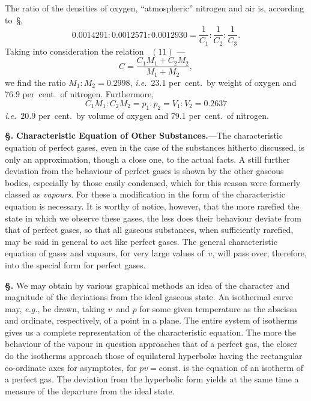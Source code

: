 \documentclass[12pt]{book}[2005/09/16]
\newcommand{\Chg}[2]{#2}
\newcommand{\Add}[1]{\Chg{}{#1}}
\newcommand{\Section}[1]{
  \medskip\par\textbf{§\;#1}
  \label{section:#1}
}
\newcommand{\SecRef}[2][§\;]{\hyperref[section:#2.]{{\upshape #1#2}}}
\newcommand{\Eq}[1]{%
  \hyperref[eqn:#1]{\ensuremath{#1}}%
}
\newcommand{\PageSep}[1]{\ignorespaces}
\newcommand{\Topic}[1]{\textbf{#1}}
\newcommand{\const}{\text{const.}}
\newcommand{\eg}{\emph{e.g.}}
\newcommand{\ie}{\emph{i.e.}}
\begin{document}
The ratio of the densities of oxygen, ``atmospheric''
nitrogen and air is, according to~\SecRef{11},
\[
0.0014291 : 0.0012571 : 0.0012930 = \frac{1}{C_{1}} : \frac{1}{C_{2}} : \frac{1}{C_{3}}\Add{.}
\]
\PageSep{12}
Taking into consideration the relation~\Eq{(11)}---
\[
C = \frac{C_{1}M_{1} + C_{2}M_{2}}{M_{1} + M_{2}},
\]
we find the ratio $M_{1} : M_{2} = 0.2998$, \ie\ $23.1$ per~cent.\
by weight of oxygen and $76.9$ per~cent.\ of nitrogen.
Furthermore,
\[
C_{1}M_{1} : C_{2}M_{2} = p_{1} : p_{2} = V_{1} : V_{2} = 0.2637
\]
\ie\ $20.9$ per~cent.\ by volume of oxygen and $79.1$ per~cent.\ of
nitrogen.

\Section{21.} \Topic{Characteristic Equation of Other Substances.}---The
characteristic equation of perfect gases, even in the
case of the substances hitherto discussed, is only an approximation,
though a close one, to the actual facts. A still
further deviation from the behaviour of perfect gases is
shown by the other gaseous bodies, especially by those easily
condensed, which for this reason were formerly classed as
\emph{vapours}. For these a modification in the form of the
characteristic equation is necessary. It is worthy of notice,
however, that the more rarefied the state in which we observe
these gases, the less does their behaviour deviate from that
of perfect gases, so that all gaseous substances, when sufficiently
rarefied, may be said in general to act like perfect
gases. The general characteristic equation of gases and
vapours, for very large values of~$v$, will pass over, therefore,
into the special form for perfect gases.

\Section{22.} We may obtain by various graphical methods an
idea of the character and magnitude of the deviations from
the ideal gaseous state. An isothermal curve may, \eg, be
drawn, taking $v$~and $p$ for some given temperature as the
abscissa and ordinate, respectively, of a point in a plane.
The entire system of isotherms gives us a complete representation
of the characteristic equation. The more the
behaviour of the vapour in question approaches that of a
perfect gas, the closer do the isotherms approach those of
equilateral hyperbolæ having the rectangular co-ordinate
\PageSep{13}
axes for asymptotes, for $pv = \const$ is the equation of an
isotherm of a perfect gas. The deviation from the hyperbolic
form yields at the same time a measure of the
departure from the ideal state.
\end{document}
